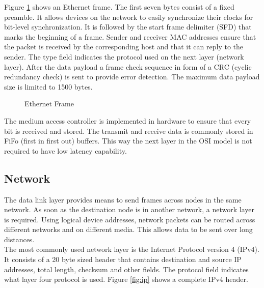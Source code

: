 Figure \ref{fig:eth} shows an Ethernet frame. The first seven bytes consist of a fixed preamble. It allows devices on the network to easily synchronize their 
clocks for bit-level synchronization. It is followed by the start frame delimiter (SFD) that marks the beginning of a frame. Sender and receiver MAC addresses ensure that the packet is received by the corresponding host and that it can reply to the sender. The type field indicates the protocol used on the next layer (network layer). After the data payload a frame check sequence in form of a CRC (cyclic redundancy check) is sent to provide error detection. The maximum data payload size is limited to 1500 bytes.
\\

\begin{figure}[tb!]
    \centering
    \begin{adjustbox}{max width=\textwidth}
        
    \end{adjustbox}
    \caption{Ethernet Frame}
    \label{fig:eth}
\end{figure}
The medium access controller is implemented in hardware to ensure that every bit is received and stored. The transmit and receive data is commonly stored in
FiFo (first in first out) buffers. This way the next layer in the OSI model is
not required to have low latency capability.


\subsection{Network} 
The data link layer provides means to send frames across nodes in the same
network. As soon as the destination node is in another network, a network layer
is required. Using logical device addresses, network packets can be routed
across different networks and on different media. This allows data to be sent
over long distances.
\\

The most commonly used network layer is the Internet Protocol version 4 (IPv4).
It consists of a 20 byte sized header that contains destination and source IP
addresses, total length, checksum and other fields. The protocol field indicates what layer four protocol is used. Figure \ref{fig:ip} shows a complete IPv4 header.

